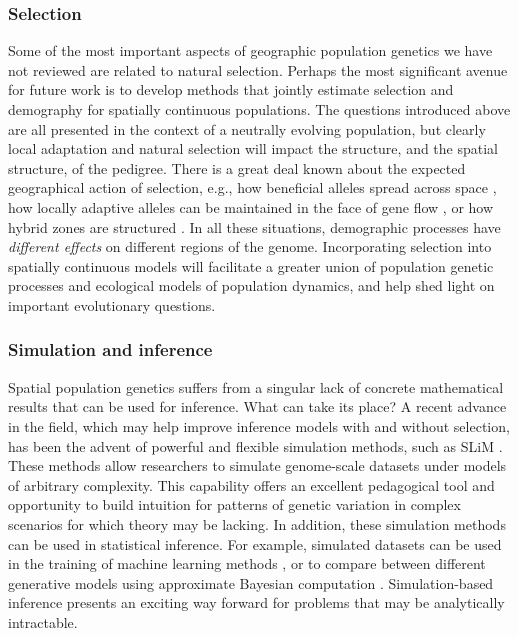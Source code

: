\documentclass{ar-1col}
\renewcommand{\emph}[1]{{\textit{#1}}}
\begin{document}
\subsubsection{Selection}

Some of the most important aspects of geographic population genetics
we have not reviewed are related to natural selection.
Perhaps the most significant avenue for future work is to 
develop methods that jointly estimate selection and demography for spatially continuous populations. 
The questions introduced above are all presented in the context 
of a neutrally evolving population,
but clearly local adaptation and natural selection will impact 
the structure, and the spatial structure, of the pedigree.
There is a great deal known about the expected geographical action of selection,
e.g., how beneficial alleles spread across space \citep{fisher1932,hallatschek,ralph2010},
how locally adaptive alleles can be maintained in the face of gene flow \citep{slatkin_local,barton,RalphCoop2015patchy},
or how hybrid zones are structured \citep{barton_hybrid,sedghifar_2015}.
In all these situations,
demographic processes have \emph{different effects} on different regions of the genome.
Incorporating selection into spatially continuous models 
will facilitate a greater union of population genetic processes 
and ecological models of population dynamics, 
and help shed light on important evolutionary questions.


\subsubsection{Simulation and inference} 

Spatial population genetics suffers from a singular lack of concrete mathematical results
that can be used for inference.
What can take its place?
A recent advance in the field, 
which may help improve inference models with and without selection, 
has been the advent of powerful and flexible simulation methods, 
such as SLiM \citep{haller2018forward,haller2018treesequence,kelleher2018efficient}.
These methods allow
researchers to simulate genome-scale datasets under models of arbitrary complexity.
This capability offers an excellent pedagogical tool 
and opportunity to build intuition for patterns of genetic variation 
in complex scenarios for which theory may be lacking.
In addition, these simulation methods can be used in statistical inference.
For example, simulated datasets can be used in the training 
of machine learning methods \citep[e.g.,][]{SchriderKern2018}, 
or to compare between different generative models using 
approximate Bayesian computation \citep{MarjoramTavare2006modern}.
Simulation-based inference presents an exciting way forward 
for problems that may be analytically intractable.
\end{document}
